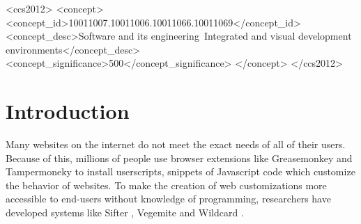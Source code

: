 \documentclass[sigconf,10pt]{acmart}
\begin{document}
\begin{CCSXML}
<ccs2012>
<concept>
<concept_id>10011007.10011006.10011066.10011069</concept_id>
<concept_desc>Software and its engineering~Integrated and visual development environments</concept_desc>
<concept_significance>500</concept_significance>
</concept>
</ccs2012>
\end{CCSXML}




\maketitle

\hypertarget{sec:introduction}{%
\section{Introduction}\label{sec:introduction}}

Many websites on the internet do not meet the exact needs of all of
their users. Because of this, millions of people use browser extensions
like Greasemonkey \citep{zotero-224} and Tampermoneky \citep{zotero-191}
to install userscripts, snippets of Javascript code which customize the
behavior of websites. To make the creation of web customizations more
accessible to end-users without knowledge of programming, researchers
have developed systems like Sifter \citep{huynh2006}, Vegemite
\citep{lin2009} and Wildcard \citep{litt2020, litt2020b}.
\end{document}
